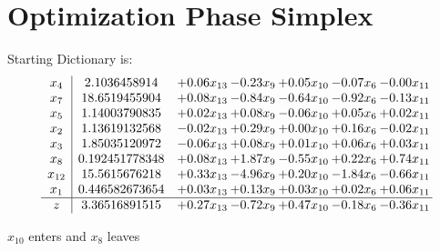 \documentclass[9pt]{article}
\begin{document}
\section{Optimization Phase Simplex}
Starting Dictionary is:
\[\begin{array}{c| c c@{\hskip 2pt} c@{\hskip 2pt} c@{\hskip 2pt} c@{\hskip 2pt} c@{\hskip 2pt} }
 x_{4}   &  2.1036458914 & +  0.06 x_{13} & -0.23 x_{9} & +  0.05 x_{10} & -0.07 x_{6} & -0.00 x_{11}\\
 x_{7}   &  18.6519455904 & +  0.08 x_{13} & -0.84 x_{9} & -0.64 x_{10} & -0.92 x_{6} & -0.13 x_{11}\\
 x_{5}   &  1.14003790835 & +  0.02 x_{13} & +  0.08 x_{9} & -0.06 x_{10} & +  0.05 x_{6} & +  0.02 x_{11}\\
 x_{2}   &  1.13619132568 & -0.02 x_{13} & +  0.29 x_{9} & +  0.00 x_{10} & +  0.16 x_{6} & -0.02 x_{11}\\
 x_{3}   &  1.85035120972 & -0.06 x_{13} & +  0.08 x_{9} & +  0.01 x_{10} & +  0.06 x_{6} & +  0.03 x_{11}\\
 x_{8}   &  0.192451778348 & +  0.08 x_{13} & +  1.87 x_{9} & -0.55 x_{10} & +  0.22 x_{6} & +  0.74 x_{11}\\
 x_{12}   &  15.5615676218 & +  0.33 x_{13} & -4.96 x_{9} & +  0.20 x_{10} & -1.84 x_{6} & -0.66 x_{11}\\
 x_{1}   &  0.446582673654 & +  0.03 x_{13} & +  0.13 x_{9} & +  0.03 x_{10} & +  0.02 x_{6} & +  0.06 x_{11}\\
\hline
z    &  3.36516891515 & +  0.27 x_{13} & -0.72 x_{9} & +  0.47 x_{10} & -0.18 x_{6} & -0.36 x_{11}\\
\end{array}\]


 $ x_{10} $ enters and $ x_{8} $ leaves 
\end{document}
